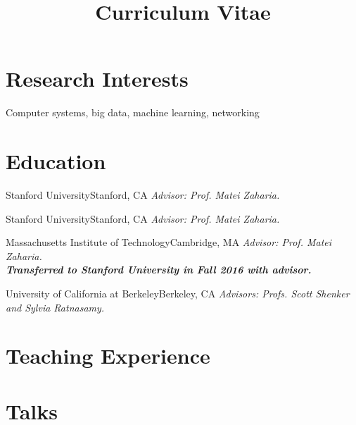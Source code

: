 \documentclass[10pt,letterpaper,sans]{moderncv}
\title{Curriculum Vitae}
\makeatletter
\renewcommand\@biblabel[1]{\textbullet}
\makeatother
\begin{document}
\makecvtitle
\section{Research Interests}
Computer systems, big data, machine learning, networking

\section{Education}
{Stanford University}{Stanford, CA}{
\emph{Advisor: Prof. Matei Zaharia.}
}{}

{Stanford University}{Stanford, CA}{
\emph{Advisor: Prof. Matei Zaharia.}
}{}

{Massachusetts Institute of Technology}{Cambridge, MA}{
\emph{Advisor: Prof. Matei Zaharia.} \\
\textbf{\emph{Transferred to Stanford University in Fall 2016 with advisor.}}
}{}

{University of California at Berkeley}{Berkeley, CA}{
\emph{Advisors: Profs. Scott Shenker and Sylvia Ratnasamy.}
}{}

\section{Teaching Experience}

 {}
 {}
 {}

\makeatletter
\renewcommand\@biblabel[1]{\textbullet}
\makeatother


\nocite{*}


\section{Talks}
\end{document}
